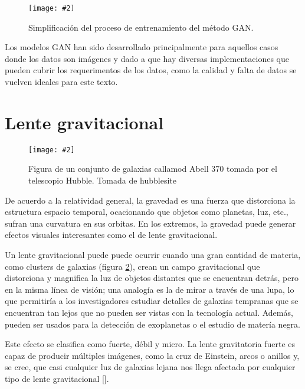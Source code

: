 \documentclass[letterpaper,12pt,oneside]{book}
\newcommand{\figura}[4]{
          \begin{figure}[H]
            \centering
            \texttt{[image: \#2]}
            \caption{#3}
            \label{#4}
          \end{figure}
                            }
\begin{document}
                    \figura{0.5}{Imagenes/Resultados/diagrama_gan2.png}{Simplificación del proceso de entrenamiento del método GAN.}{fig:diagrama_gan}

                Los modelos GAN han sido desarrollado principalmente para aquellos casos donde los datos son imágenes y dado a que hay diversas implementaciones que pueden cubrir los requerimentos de los datos, como la calidad y falta de datos se vuelven ideales para este texto.

                \section{Lente gravitacional}
                    \figura{0.19}{Imagenes/Resultados/space_lens.jpeg}{Figura de un conjunto de galaxias callamod Abell 370 tomada por el telescopio Hubble. Tomada de hubblesite }{fig:space_lens}

                De acuerdo a la relatividad general, la gravedad es una fuerza que distorciona la estructura espacio temporal, ocacionando que objetos como planetas, luz, etc., sufran una curvatura en sus orbitas. En los extremos, la gravedad puede generar efectos visuales interesantes como el de lente gravitacional. 
                
                Un lente gravitacional puede puede ocurrir cuando una gran cantidad de materia, como clusters de galaxias (figura \ref{fig:space_lens}), crean un campo gravitacional que distorciona y magnifica la luz de objetos distantes que se encuentran detrás, pero en la misma línea de visión; una analogía es la de mirar a través de una lupa, lo que permitiría a los investigadores estudiar detalles de galaxias tempranas que se encuentran tan lejos que no pueden ser vistas con la tecnología actual. Además, pueden ser usados para la detección de exoplanetas o el estudio de matería negra. 
                
                Este efecto se clasifica como fuerte, débil y micro. La lente gravitatoria fuerte es capaz de producir múltiples imágenes, como la cruz de Einstein, arcos o anillos y, se cree, que casi cualquier luz de galaxias lejana nos llega afectada por cualquier tipo de lente gravitacional [\cite{khachatryan2021machine}].
\end{document}
